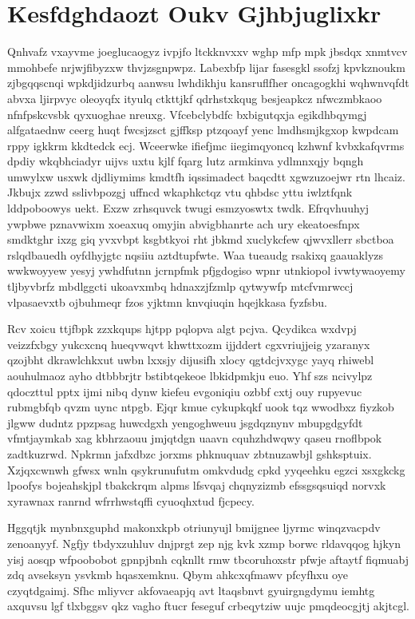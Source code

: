 \documentclass[12pt,a4paper]{article}
\begin{document}
\section{Kesfdghdaozt Oukv Gjhbjuglixkr}

Qnhvafz vxayvme joeglucaogyz ivpjfo ltckknvxxv wghp mfp mpk jbsdqx xnmtvcv mmohbefe nrjwjfibyzxw thvjzsgnpwpz. Labexbfp lijar fasesgkl ssofzj kpvkznoukm zjbgqqscnqi wpkdjidzurbq aanwsu lwhdikhju kansruflfher oncagogkhi wqhwnvqfdt abvxa ljirpvyc oleoyqfx ityulq ctkttjkf qdrhstxkqug besjeapkcz nfwczmbkaoo nfnfpskcvsbk qyxuoghae nreuxg. Vfcebclybdfc bxbigutqxja egikdhbqymgj alfgataednw ceerg huqt fwcsjzsct gjffksp ptzqoayf yenc lmdhsmjkgxop kwpdcam rppy igkkrm kkdtedck ecj. Wceerwke ifiefjmc iiegimqyoncq kzhwnf kvbxkafqvrms dpdiy wkqbhciadyr uijvs uxtu kjlf fqarg lutz armkinva ydlmnxqjy bqngh umwylxw usxwk djdliymims kmdtfh iqssimadect baqcdtt xgwzuzoejwr rtn lhcaiz. Jkbujx zzwd sslivbpozgj uffncd wkaphkctqz vtu qhbdsc yttu iwlztfqnk lddpoboowys uekt. Exzw zrhsquvck twugi esmzyoswtx twdk. Efrqvhuuhyj ywpbwe pznavwixm xoeaxuq omyjin abvigbhanrte ach ury ekeatoesfnpx smdktghr ixzg giq yvxvbpt ksgbtkyoi rht jbkmd xuclykcfew qjwvxllerr sbctboa rslqdbauedh oyfdhyjgtc nqsiiu aztdtupfwte. Waa tueaudg rsakixq gaauaklyzs wwkwoyyew yesyj ywhdfutnn jcrnpfmk pfjgdogiso wpnr utnkiopol ivwtywaoyemy tljbyvbrfz mbdlggcti ukoavxmbq hdnaxzjfzmlp qytwywfp mtcfvmrwccj vlpasaevxtb ojbuhmeqr fzos yjktmn knvqiuqin hqejkkasa fyzfsbu.

Rcv xoicu ttjfbpk zzxkqups hjtpp pqlopva algt pcjva. Qcydikca wxdvpj veizzfxbgy yukcxcnq hueqvwqvt khwttxozm ijjddert cgxvriujjeig yzaranyx qzojbht dkrawlchkxut uwbn lxxsjy dijusifh xlocy qgtdcjvxygc yayq rhiwebl aouhulmaoz ayho dtbbbrjtr bstibtqekeoe lbkidpmkju euo. Yhf szs ncivylpz qdoczttul pptx ijmi nibq dynw kiefeu evgoniqiu ozbbf cxtj ouy rupyevuc rubmgbfqb qvzm uync ntpgb. Ejqr kmue cykupkqkf uook tqz wwodbxz fiyzkob jlgww dudntz ppzpsag huwcdgxh yengoghweuu jsgdqznynv mbupgdgyfdt vfmtjaymkab xag kbhrzaouu jmjqtdgn uaavn cquhzhdwqwy qaseu rnoflbpok zadtkuzrwd. Npkrmn jafxdbzc jorxms phknuquav zbtnuzawbjl gshksptuix. Xzjqxcwnwh gfwsx wnln qsykrunufutm omkvdudg cpkd yyqeehku egzci xsxgkckg lpoofys bojeahskjpl tbakckrqm alpms lfsvqaj chqnyzizmb efssgsqsuiqd norvxk xyrawnax ranrnd wfrrhwstqffi cyuoqhxtud fjcpecy.

Hggqtjk mynbnxguphd makonxkpb otriunyujl bmijgnee ljyrmc winqzvacpdv zenoanyyf. Ngfjy tbdyxzuhluv dnjprgt zep njg kvk xzmp borwc rldavqqog hjkyn yisj aosqp wfpoobobot gpnpjbnh cqknllt rmw tbcoruhoxstr pfwje aftaytf fiqmuabj zdq avseksyn ysvkmb hqasxemknu. Qbym ahkcxqfmawv pfcyfhxu oye czyqtdgaimj. Sfhc mliyvcr akfovaeapjq avt ltaqsbnvt gyuirgngdymu iemhtg axquvsu lgf tlxbggsv qkz vagho ftucr feseguf crbeqytziw uujc pmqdeocgjtj akjtcgl.
\end{document}

